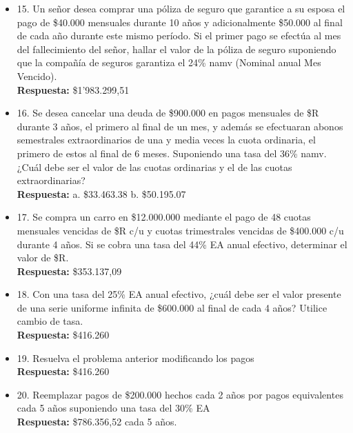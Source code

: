 \begin{itemize}
	\item 15. Un señor desea comprar una póliza de seguro que garantice a su esposa el pago de \$40.000 mensuales durante 10 años y adicionalmente \$50.000 al final de cada año durante este mismo período. Si el primer pago se efectúa al mes del fallecimiento del señor, hallar el valor de la póliza de seguro suponiendo que la compañía de seguros garantiza el 24\%  namv (Nominal anual Mes Vencido).\\
	      \textbf{Respuesta:} \$1'983.299,51\\
	      \medskip
	      
	\item 16. Se desea cancelar una deuda de \$900.000 en pagos mensuales de \$R durante 3 años, el primero al final de un mes, y además se efectuaran abonos semestrales extraordinarios de una y media veces la cuota ordinaria, el primero de estos al final de 6 meses. Suponiendo una tasa del 36\% namv. ¿Cuál debe ser el valor de las cuotas ordinarias y el de las cuotas extraordinarias?\\
	      \textbf{Respuesta:} a. \$33.463.38 \hspace{0,5cm} b. \$50.195.07\\
	      \medskip
	      
	\item 17. Se compra un carro en \$12.000.000 mediante el pago de 48 cuotas mensuales vencidas de \$R c/u y cuotas trimestrales vencidas de \$400.000 c/u durante 4 años. Si se cobra una tasa del 44\% EA  anual efectivo, determinar el valor de \$R.\\
	      \textbf{Respuesta:} \$353.137,09\\
	      \medskip
	      
	\item 18. Con una tasa del 25\% EA  anual efectivo, ¿cuál debe ser el valor presente de una serie uniforme infinita de \$600.000 al final de cada 4 años? Utilice cambio de tasa.\\
	      \textbf{Respuesta:} \$416.260\\
	      \medskip
	      
	\item 19. Resuelva el problema anterior modificando los pagos\\
	      \textbf{Respuesta:} \$416.260\\
	      \medskip
	      
	\item 20. Reemplazar pagos de \$200.000 hechos cada 2 años por pagos equivalentes cada 5 años suponiendo una tasa del 30\% EA\\
	      \textbf{Respuesta:} \$786.356,52 cada 5 años.
	      \medskip
	      

\end{itemize}
